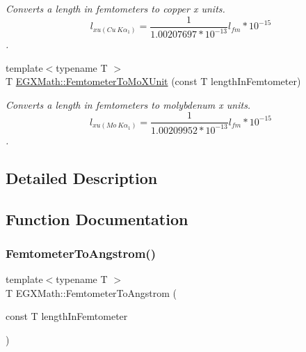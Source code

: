 \begin{DoxyCompactItemize}
\begin{DoxyCompactList}\small\item\em Converts a length in femtometers to copper x units. \[ l_{xu(Cu\ K\alpha_1)}= \frac{1}{1.00207697*10^{-13}} l_{fm} * 10^{-15}\]. \end{DoxyCompactList}\item 
{\footnotesize template$<$typename T $>$ }\\T \mbox{\hyperlink{group___e_g_x_math-_conversions-_length_conversions-_s_i-_femtometer-_non-_s_i_ga57801d7c681362c1a11053233e31c415}{E\+G\+X\+Math\+::\+Femtometer\+To\+Mo\+X\+Unit}} (const T length\+In\+Femtometer)
\begin{DoxyCompactList}\small\item\em Converts a length in femtometers to molybdenum x units. \[ l_{xu(Mo\ K\alpha_1)}=\frac{1}{1.00209952*10^{-13}} l_{fm} * 10^{-15}\]. \end{DoxyCompactList}\end{DoxyCompactItemize}


\subsection{Detailed Description}


\subsection{Function Documentation}
\mbox{\label{group___e_g_x_math-_conversions-_length_conversions-_s_i-_femtometer-_non-_s_i_ga72862654ebe3812db0fbf8d11d7059ff}} 
\subsubsection{\texorpdfstring{Femtometer\+To\+Angstrom()}{FemtometerToAngstrom()}}
{\footnotesize\ttfamily template$<$typename T $>$ \\
T E\+G\+X\+Math\+::\+Femtometer\+To\+Angstrom (\begin{DoxyParamCaption}\item[{const T}]{length\+In\+Femtometer }\end{DoxyParamCaption})}



